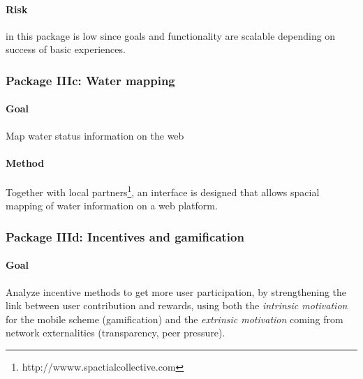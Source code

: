 \documentclass[11pt]{article}
\newcommand{\simon}[1]{\vspace{1em}(\emph{Simon: #1})\vspace{1em}}
\begin{document}
\paragraph{Risk} in this package is low since goals and functionality are scalable depending on success of basic experiences.


\subsubsection*{Package IIIc: Water mapping}
\paragraph{Goal} Map water status information on the web
\paragraph{Method} Together with local partners\footnote{http://wwww.spactialcollective.com}, an interface is designed that allows spacial mapping of water information on a web platform.

% 


\subsubsection*{Package IIId: Incentives and gamification}
\paragraph{Goal} Analyze incentive methods to get more user participation, by strengthening the link between user contribution and rewards, using both the \emph{intrinsic motivation} for the mobile scheme (gamification) and the \emph{extrinsic motivation} coming from network externalities (transparency, peer pressure).
\end{document}
